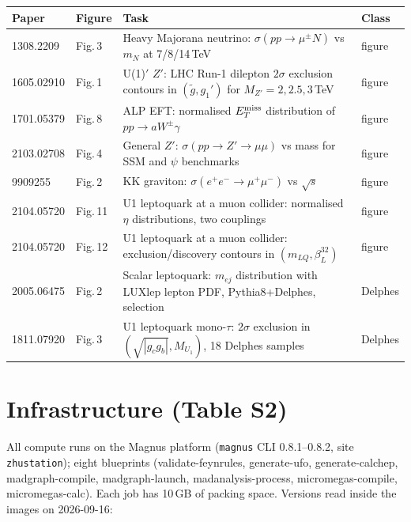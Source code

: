 \documentclass[10pt,a4paper]{article}
\newcommand{\code}[1]{\texttt{#1}}
\begin{document}
\begin{center}\small
\begin{tabular}{llp{9.2cm}l}
\toprule
Paper & Figure & Task & Class \\
\midrule
1308.2209 & Fig.\,3 & Heavy Majorana neutrino: $\sigma(pp\to\mu^\pm N)$ vs $m_N$ at 7/8/14\,TeV & figure \\
1605.02910 & Fig.\,1 & U(1)$'$ $Z'$: LHC Run-1 dilepton $2\sigma$ exclusion contours in $(\tilde g, g_1')$ for $M_{Z'}=2,2.5,3$\,TeV & figure \\
1701.05379 & Fig.\,8 & ALP EFT: normalised $E_T^{\rm miss}$ distribution of $pp\to aW^\pm\gamma$ & figure \\
2103.02708 & Fig.\,4 & General $Z'$: $\sigma(pp\to Z'\to\mu\mu)$ vs mass for SSM and $\psi$ benchmarks & figure \\
9909255 & Fig.\,2 & KK graviton: $\sigma(e^+e^-\to\mu^+\mu^-)$ vs $\sqrt s$ & figure \\
2104.05720 & Fig.\,11 & U1 leptoquark at a muon collider: normalised $\eta$ distributions, two couplings & figure \\
2104.05720 & Fig.\,12 & U1 leptoquark at a muon collider: exclusion/discovery contours in $(m_{LQ},\beta_L^{32})$ & figure \\
2005.06475 & Fig.\,2 & Scalar leptoquark: $m_{ej}$ distribution with LUXlep lepton PDF, Pythia8+Delphes, selection & Delphes \\
1811.07920 & Fig.\,3 & U1 leptoquark mono-$\tau$: $2\sigma$ exclusion in $(\sqrt{|g_cg_b|}, M_{U_1})$, 18 Delphes samples & Delphes \\
\bottomrule
\end{tabular}
\end{center}

\section{Infrastructure (Table S2)}
All compute runs on the Magnus platform (\code{magnus} CLI 0.8.1--0.8.2, site \code{zhustation}); eight blueprints (validate-feynrules, generate-ufo, generate-calchep, madgraph-compile, madgraph-launch, madanalysis-process, micromegas-compile, micromegas-calc). Each job has 10\,GB of packing space. Versions read inside the images on 2026-09-16:
\end{document}
